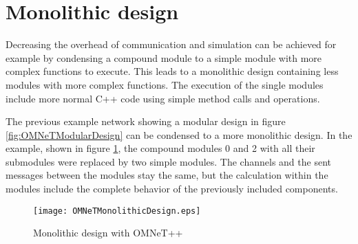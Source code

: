 \section{Monolithic design}
Decreasing the overhead of communication and simulation can be achieved for example by condensing a compound module to a simple module with more complex functions to execute.
This leads to a monolithic design containing less modules with more complex functions.
The execution of the single modules include more normal C++ code using simple method calls and operations.

The previous example network showing a modular design in figure \ref{fig:OMNeTModularDesign} can be condensed to a more monolithic design.
In the example, shown in figure \ref{fig:OMNeTMonolithicDesign}, the compound modules 0 and 2 with all their submodules were replaced by two simple modules.
The channels and the sent messages between the modules stay the same, but the calculation within the modules include the complete behavior of the previously included components.

\begin{figure}
    \centering
    \texttt{[image: OMNeTMonolithicDesign.eps]}
    \caption{Monolithic design with OMNeT++}
    \label{fig:OMNeTMonolithicDesign}
\end{figure}


